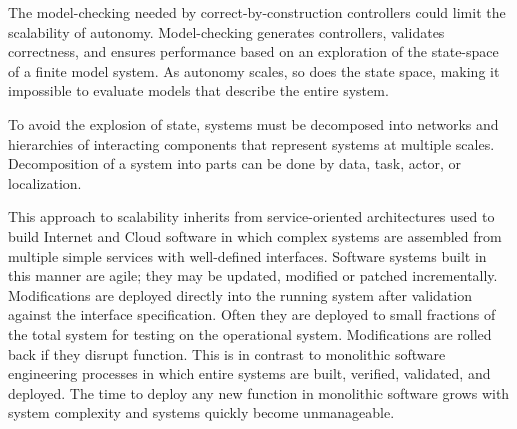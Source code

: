 

The model-checking needed by correct-by-construction controllers could limit the scalability of 
autonomy.  Model-checking generates controllers, validates correctness, and ensures performance based on 
an exploration of the state-space of a finite model system.   As autonomy scales, so does the 
state space, making it impossible to evaluate models that describe the entire system. 

To avoid the explosion of state, systems must be decomposed into networks and hierarchies of 
interacting components that represent systems at multiple scales.  Decomposition of
a system into parts can be done by data, task, actor, or localization.

This approach to scalability inherits from service-oriented architectures used to build 
Internet and Cloud software 
in which complex systems are assembled from multiple simple services with well-defined interfaces.
Software systems built in this manner are agile; they may be updated, modified or patched incrementally.  
Modifications are deployed directly into the running system after validation against the interface
specification.  Often they are deployed to small fractions of the total system for testing on the 
operational system.  Modifications are rolled back if they disrupt function.
This is in contrast to monolithic software engineering processes in which 
entire systems are built, verified, validated, and deployed.  The time to deploy any new function
in monolithic software grows with system complexity and systems quickly become unmanageable. 

